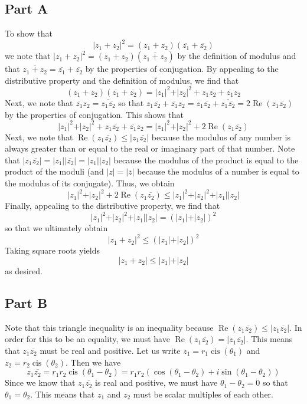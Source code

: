 \documentclass[12pt]{article}
\DeclareMathOperator{\re}{Re}
\DeclareMathOperator{\cis}{cis}
\begin{document}
\subsection*{Part A}
To show that \[\vert z_1 + z_2\vert^2 = (z_1 + z_2)(\overline{z_1}+ \overline{z_2})\] we note that $\vert z_1 + z_2 \vert ^2 = (z_1+z_2)(\overline{z_1+z_2})$ by the definition of modulus and that $\overline{z_1+z_2} = \overline{z_1} + \overline{z_2}$ by the properties of conjugation. By appealing to the distributive property and the definition of modulus, we find that
\[
(z_1 + z_2)(\overline{z_1}+ \overline{z_2}) = \vert z_1 \vert^2 + \vert z_2 \vert ^2 + z_1\overline{z_2} + \overline{z_1}z_2
\] Next, we note that $\overline{z_1}z_2 = \overline{z_1\overline{z_2}}$ so that $z_1\overline{z_2} + \overline{z_1}z_2 = z_1\overline{z_2} +  \overline{z_1\overline{z_2}} = 2 \re(z_1\overline{z_2})$ by the properties of conjugation. This shows that
\[
\vert z_1 \vert^2 + \vert z_2 \vert ^2 + z_1\overline{z_2} + \overline{z_1}z_2 = \vert z_1 \vert^2 + \vert z_2 \vert ^2 + 2\re(z_1 \overline{z_2})
\] Next, we note that $\re(z_1\overline{z_2}) \leq \vert z_1\overline{z_2} \vert$ because the modulus of any number is always greater than or equal to the real or imaginary part of that number. Note that $\vert z_1\overline{z_2} \vert = \vert z_1 \vert \vert \overline{z_2} \vert = \vert z_1 \vert \vert z_2 \vert$ because the modulus of the product is equal to the product of the moduli (and $\vert z \vert = \vert \overline{z} \vert$ because the modulus of a number is equal to the modulus of its conjugate). Thus, we obtain 
\[
\vert z_1 \vert^2 + \vert z_2 \vert ^2 + 2\re(z_1 \overline{z_2}) \leq \vert z_1 \vert^2 + \vert z_2 \vert ^2 + \vert z_1 \vert \vert z_2 \vert
\] Finally, appealing to the distributive property, we find that
\[
 \vert z_1 \vert^2 + \vert z_2 \vert ^2 + \vert z_1 \vert \vert z_2 \vert = (\vert z_1 \vert + \vert z_2 \vert)^2
\] so that we ultimately obtain
\[
\vert z_1 + z_2 \vert ^2 \leq (\vert z_1 \vert + \vert z_2 \vert)^2
\] Taking square roots yields
\[
\vert z_1 + z_2 \vert \leq \vert z_1 \vert + \vert z_2 \vert
\] as desired.
\subsection*{Part B}
Note that this triangle inequality is an inequality because $\re(z_1\overline{z_2}) \leq \vert z_1 \overline{z_2} \vert$. In order for this to be an equality, we must have $\re(z_1\overline{z_2}) = \vert z_1 \overline{z_2} \vert$. This means that $z_1 \overline{z_2}$ must be real and positive. Let us write $z_1 = r_1\cis(\theta_1)$ and $z_2 = r_2\cis(\theta_2)$. Then we have
\[
z_1 \overline{z_2} = r_1r_2 \cis(\theta_1-\theta_2) = r_1r_2(\cos(\theta_1-\theta_2)+i\sin(\theta_1-\theta_2))
\] Since we know that $z_1 \overline{z_2}$ is real and positive, we must have $\theta_1 - \theta_2 = 0$ so that $\theta_1 = \theta_2$. This means that $z_1$ and $z_2$ must be scalar multiples of each other.
\end{document}
